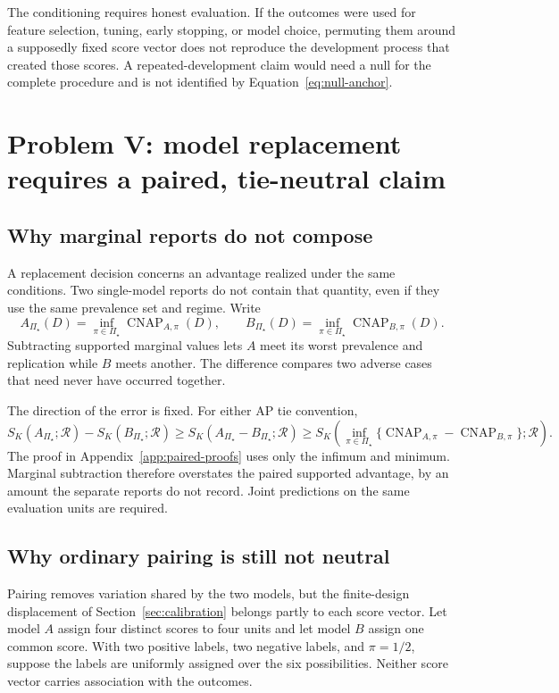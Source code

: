 \documentclass[11pt]{article}
\newcommand{\CNAP}{\operatorname{CNAP}}
\newcommand{\Regime}{\mathcal{R}}
\newcommand{\PSet}{\Pi_\star}
\theoremstyle{remark}
\begin{document}
The conditioning requires honest evaluation. If the outcomes were used for feature selection, tuning, early stopping, or model choice, permuting them around a supposedly fixed score vector does not reproduce the development process that created those scores. A repeated-development claim would need a null for the complete procedure and is not identified by Equation~\eqref{eq:null-anchor}.

\section{Problem V: model replacement requires a paired, tie-neutral claim}
\label{sec:paired}

\subsection{Why marginal reports do not compose}

A replacement decision concerns an advantage realized under the same conditions. Two single-model reports do not contain that quantity, even if they use the same prevalence set and regime. Write
\[
A_{\PSet}(D)
=
\inf_{\pi\in\PSet}\CNAP_{A,\pi}(D),
\qquad
B_{\PSet}(D)
=
\inf_{\pi\in\PSet}\CNAP_{B,\pi}(D).
\]
Subtracting supported marginal values lets $A$ meet its worst prevalence and replication while $B$ meets another. The difference compares two adverse cases that need never have occurred together.

The direction of the error is fixed. For either AP tie convention,
\begin{equation}
S_K(A_{\PSet};\Regime)
-
S_K(B_{\PSet};\Regime)
\geq
S_K(A_{\PSet}-B_{\PSet};\Regime)
\geq
S_K\left(
\inf_{\pi\in\PSet}
\{\CNAP_{A,\pi}-\CNAP_{B,\pi}\};
\Regime
\right).
\label{eq:noncomposition}
\end{equation}
The proof in Appendix~\ref{app:paired-proofs} uses only the infimum and minimum. Marginal subtraction therefore overstates the paired supported advantage, by an amount the separate reports do not record. Joint predictions on the same evaluation units are required.

\subsection{Why ordinary pairing is still not neutral}

Pairing removes variation shared by the two models, but the finite-design displacement of Section~\ref{sec:calibration} belongs partly to each score vector. Let model $A$ assign four distinct scores to four units and let model $B$ assign one common score. With two positive labels, two negative labels, and $\pi=1/2$, suppose the labels are uniformly assigned over the six possibilities. Neither score vector carries association with the outcomes.
\end{document}
